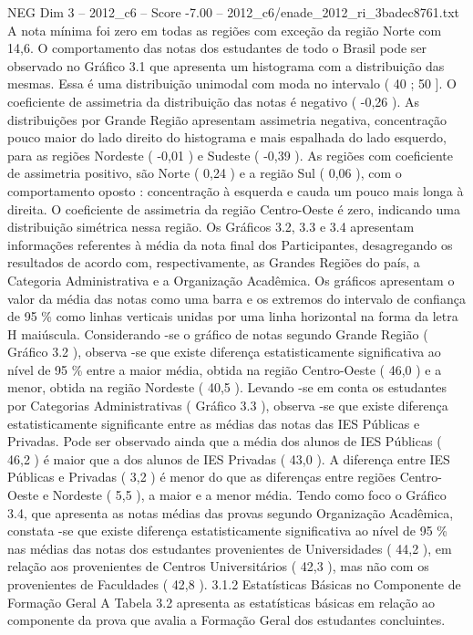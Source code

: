 \begin{textsample}{NEG Dim 3 – 2012\_c6 – Score -7.00 – 2012\_c6/enade\_2012\_ri\_3badec8761.txt}
A nota mínima foi zero em todas as regiões com exceção da região Norte com 14,6.
O comportamento das notas dos estudantes de todo o Brasil pode ser observado no Gráfico 3.1 que apresenta um histograma com a distribuição das mesmas.
Essa é uma distribuição unimodal com moda no intervalo ( 40 ; 50 ].
O coeficiente de assimetria da distribuição das notas é negativo ( -0,26 ).
As distribuições por Grande Região apresentam assimetria negativa, concentração pouco maior do lado direito do histograma e mais espalhada do lado esquerdo, para as regiões Nordeste ( -0,01 ) e Sudeste ( -0,39 ).
As regiões com coeficiente de assimetria positivo, são Norte ( 0,24 ) e a região Sul ( 0,06 ), com o comportamento oposto : concentração à esquerda e cauda um pouco mais longa à direita.
O coeficiente de assimetria da região Centro-Oeste é zero, indicando uma distribuição simétrica nessa região.
Os Gráficos 3.2, 3.3 e 3.4 apresentam informações referentes à média da nota final dos Participantes, desagregando os resultados de acordo com, respectivamente, as Grandes Regiões do país, a Categoria Administrativa e a Organização Acadêmica.
Os gráficos apresentam o valor da média das notas como uma barra e os extremos do intervalo de confiança de 95 \% como linhas verticais unidas por uma linha horizontal na forma da letra H maiúscula.
Considerando -se o gráfico de notas segundo Grande Região ( Gráfico 3.2 ), observa -se que existe diferença estatisticamente significativa ao nível de 95 \% entre a maior média, obtida na região Centro-Oeste ( 46,0 ) e a menor, obtida na região Nordeste ( 40,5 ).
Levando -se em conta os estudantes por Categorias Administrativas ( Gráfico 3.3 ), observa -se que existe diferença estatisticamente significante entre as médias das notas das IES Públicas e Privadas.
Pode ser observado ainda que a média dos alunos de IES Públicas ( 46,2 ) é maior que a dos alunos de IES Privadas ( 43,0 ).
A diferença entre IES Públicas e Privadas ( 3,2 ) é menor do que as diferenças entre regiões Centro-Oeste e Nordeste ( 5,5 ), a maior e a menor média.
Tendo como foco o Gráfico 3.4, que apresenta as notas médias das provas segundo Organização Acadêmica, constata -se que existe diferença estatisticamente significativa ao nível de 95 \% nas médias das notas dos estudantes provenientes de Universidades ( 44,2 ), em relação aos provenientes de Centros Universitários ( 42,3 ), mas não com os provenientes de Faculdades ( 42,8 ). 3.1.2 Estatísticas Básicas no Componente de Formação Geral A Tabela 3.2 apresenta as estatísticas básicas em relação ao componente da prova que avalia a Formação Geral dos estudantes concluintes.

\end{textsample}
